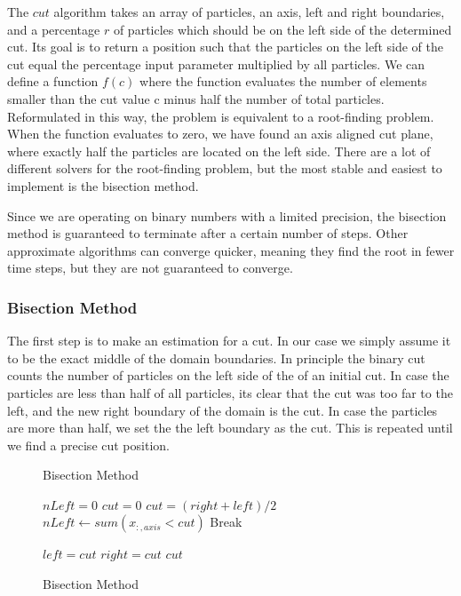 \documentclass[]{article}
\begin{document}
The $cut$ algorithm takes an array of particles, an axis, left and right boundaries, and a percentage $r$ of particles which should be on the left side of the determined cut. Its goal is to return a position such that the particles on the left side of the cut equal the percentage input parameter multiplied by all particles. We can define a function $f(c)$ where the function evaluates the number of elements smaller than the cut value c minus half the number of total particles. Reformulated in this way, the problem is equivalent to a root-finding problem. When the function evaluates to zero, we have found an axis aligned cut plane, where exactly half the particles are located on the left side. There are a lot of different solvers for the root-finding problem, but the most stable and easiest to implement is the bisection method. 

Since we are operating on binary numbers with a limited precision, the bisection method is guaranteed to terminate after a certain number of steps. Other approximate algorithms can converge quicker, meaning they find the root in fewer time steps, but they are not guaranteed to converge. 	

\subsubsection{Bisection Method}

The first step is to make an estimation for a cut. In our case we simply assume it to be the exact middle of the domain boundaries. In principle the binary cut counts the number of particles on the left side of the of an initial cut. In case the particles are less than half of all particles, its clear that the cut was too far to the left, and the new right boundary of the domain is the cut. In case the particles are more than half, we set the the left boundary as the cut. This is repeated until we find a precise cut position.


\begin{figure}
	
	\begin{algorithm}[H]
		\caption{Bisection Method}\label{algo:cut}
		\begin{algorithmic}[1]
			\State $nLeft = 0$
			\State $cut = 0$
			\newline
			\State $cut = (right + left ) / 2 $
			\State $nLeft\gets sum(x_{:,axis} < cut)$
			\newline
			\State Break
			\EndIf
			\newline
			
			\State $left = cut$
			\Else 
			\State $right = cut$
			\EndIf
			\newline
			\EndFor
			\State \Return $cut$
			\EndProcedure
		\end{algorithmic}
	\end{algorithm}
\caption{Bisection Method}
\label{proc:cut}
\end{figure}
\end{document}
